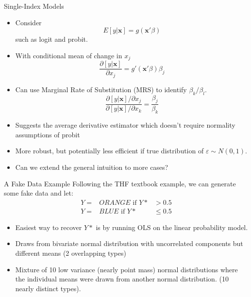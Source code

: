 \begin{frame}{Single-Index Models}
 
  \begin{itemize}
  \item Consider $$ E \left[ y | \mathbf{x} \right] = g(\mathbf{x}'\beta ) $$ 
  such as logit and probit. 
  \item With conditional mean of change in $x_j$ 
  $$ \frac{ \partial \left[ y | \mathbf{x} \right]}{\partial x_j} = g'(\mathbf{x}'\beta ) \beta_j $$ 
  
  \item Can use Marginal Rate of Substitution (MRS) to identify $\beta_k / \beta_l$.
  $$ \frac{ \partial \left[ y | \mathbf{x} \right] / \partial x_j }{ \partial \left[ y | \mathbf{x} \right] / \partial x_k} = \frac{\beta_j}{\beta_k} $$ 
  
  \item Suggests the \alert{average derivative estimator} which doesn't require normality assumptions of probit
  \item More robust, but potentially less efficient if true distribution of $\varepsilon \sim N(0,1)$.
  \item Can we extend the general intuition to more cases?
  \end{itemize}
\end{frame}

  
\begin{frame}{A Fake Data Example}
Following the THF textbook example, we can generate some fake data and let: 
\begin{eqnarray*}
Y=&ORANGE \mbox{ if } Y* &> 0.5 \\
Y=&BLUE  \mbox{ if }   Y* &\leq 0.5
\end{eqnarray*}
\begin{itemize}
\item Easiest way to recover $Y*$ is by running OLS on the linear probability model.
\item Draws from bivariate normal distribution with uncorrelated components but different means (2 overlapping types)
\item Mixture of 10 low variance (nearly point mass) normal distributions where the individual means were drawn from another normal distribution. (10 nearly distinct types).
\end{itemize}
\end{frame}

